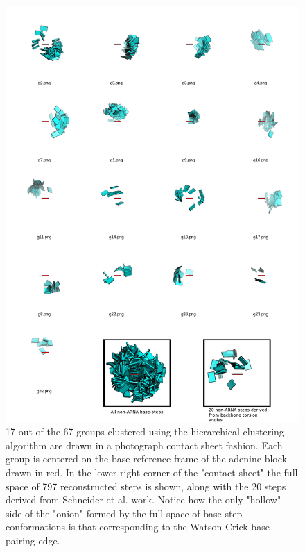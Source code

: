 \begin{figure}
\centering
\includegraphics[angle=0, scale=0.35]{Chapter2/k67_17.png}
\caption{17  out of  the 67  groups clustered  using  the hierarchical
  clustering  algorithm  are  drawn  in  a  photograph  contact  sheet
  fashion. Each group  is centered on the base  reference frame of the
  adenine  block  drawn in  red.  In the  lower  right  corner of  the
  "contact sheet" the full space  of 797 reconstructed steps is shown,
  along with the  20 steps derived from Schneider  et al. work. Notice
  how the only "hollow" side of the "onion" formed by the full space of
  base-step  conformations is that  corresponding to  the Watson-Crick
  base-pairing edge.}
\label{fig:noarnak67}
\end{figure}





